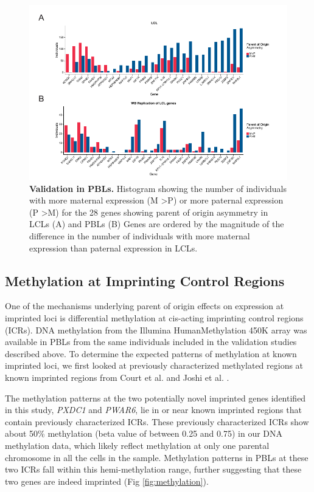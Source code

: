 \begin{figure}[!htb]
\centering \includegraphics[width=6in]{img/ch03/fig-02.pdf}
\caption[Validation in PBLs.]{\textbf{Validation in PBLs.} Histogram showing the number of individuals with more maternal expression (M \textgreater P) or more paternal expression (P \textgreater M) for the 28 genes showing parent of origin asymmetry in LCLs (A) and PBLs (B) Genes are ordered by the magnitude of the difference in the number of individuals with more maternal expression than paternal expression in LCLs. }
\label{fig:matpatPBLs}
\end{figure}


\subsection{Methylation at Imprinting Control Regions}\label{Methylation at Imprinting Control Regions}
One of the mechanisms underlying parent of origin effects on expression at imprinted loci is differential methylation at cis-acting imprinting control regions (ICRs). DNA methylation from the Illumina HumanMethylation 450K array was available in PBLs from the same individuals included in the validation studies described above. To determine the expected patterns of methylation at known imprinted loci, we first looked at previously characterized methylated regions at known imprinted regions from Court et al. and Joshi et al. \cite{Court:2014kc,Joshi:2016bb}.

The methylation patterns at the two potentially novel imprinted genes identified in this study, \emph{PXDC1} and \emph{PWAR6}, lie in or near known imprinted regions that contain previously characterized ICRs. These previously characterized ICRs show about 50\% methylation (beta value of between 0.25 and 0.75) in our DNA methylation data, which likely reflect methylation at only one parental chromosome in all the cells in the sample. Methylation patterns in PBLs at these two ICRs fall within this hemi-methylation range, further suggesting that these two genes are indeed imprinted (Fig \ref{fig:methylation}).


